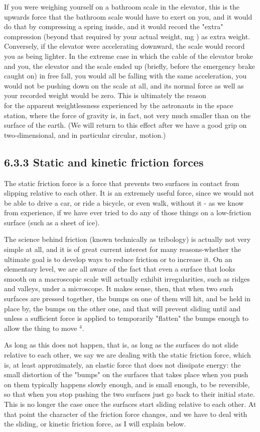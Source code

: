 \documentclass[10pt]{article}
\begin{document}
If you were weighing yourself on a bathroom scale in the elevator, this is the upwards force that the bathroom scale would have to exert on you, and it would do that by compressing a spring inside, and it would record the "extra" compression (beyond that required by your actual weight, mg ) as extra weight. Conversely, if the elevator were accelerating downward, the scale would record you as being lighter. In the extreme case in which the cable of the elevator broke and you, the elevator and the scale ended up (briefly, before the emergency brake caught on) in free fall, you would all be falling with the same acceleration, you would not be pushing down on the scale at all, and its normal force as well as your recorded weight would be zero. This is ultimately the reason\\
for the apparent weightlessness experienced by the astronauts in the space station, where the force of gravity is, in fact, not very much smaller than on the surface of the earth. (We will return to this effect after we have a good grip on two-dimensional, and in particular circular, motion.)

\subsection*{6.3.3 Static and kinetic friction forces}
The static friction force is a force that prevents two surfaces in contact from slipping relative to each other. It is an extremely useful force, since we would not be able to drive a car, or ride a bicycle, or even walk, without it - as we know from experience, if we have ever tried to do any of those things on a low-friction surface (such as a sheet of ice).

The science behind friction (known technically as tribology) is actually not very simple at all, and it is of great current interest for many reasons-whether the ultimate goal is to develop ways to reduce friction or to increase it. On an elementary level, we are all aware of the fact that even a surface that looks smooth on a macroscopic scale will actually exhibit irregularities, such as ridges and valleys, under a microscope. It makes sense, then, that when two such surfaces are pressed together, the bumps on one of them will hit, and be held in place by, the bumps on the other one, and that will prevent sliding until and unless a sufficient force is applied to temporarily "flatten" the bumps enough to allow the thing to move ${ }^{4}$.

As long as this does not happen, that is, as long as the surfaces do not slide relative to each other, we say we are dealing with the static friction force, which is, at least approximately, an elastic force that does not dissipate energy: the small distortion of the "bumps" on the surfaces that takes place when you push on them typically happens slowly enough, and is small enough, to be reversible, so that when you stop pushing the two surfaces just go back to their initial state. This is no longer the case once the surfaces start sliding relative to each other. At that point the character of the friction force changes, and we have to deal with the sliding, or kinetic friction force, as I will explain below.
\end{document}
